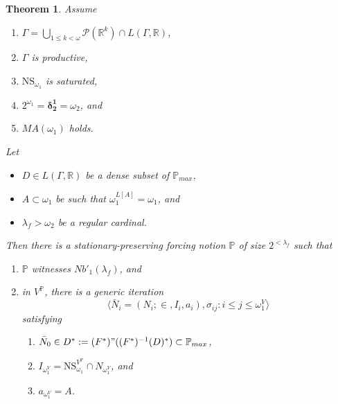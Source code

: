 \documentclass[12pt, twoside]{memoir}
\numberwithin{equation}{section}
\newtheorem{thm}{Theorem}[section]
\theoremstyle{definition}
\theoremstyle{remark}
\theoremstyle{definition}
\theoremstyle{definition}
\theoremstyle{definition}
\theoremstyle{remark}
\begin{document}
\begin{thm}\label{notion2}
Assume
\begin{enumerate}[label=(\roman*), leftmargin=40pt]
    \item\label{h1} $\Gamma  = \bigcup_{1 \leq k < \omega} \mathcal{P}(\mathbb{R}^{k}) \cap L(\Gamma, \mathbb{R})$,
    \item\label{h2} $\Gamma$ is productive,
    \item\label{h3} $\mathrm{NS}_{\omega_1}$ is saturated,
    \item\label{h4} $2^{\omega_1} = \mathbf{\delta^1_2} = \omega_2$, and
    \item\label{h5} $MA(\omega_1)$ holds.
\end{enumerate}
Let 
\begin{itemize}
    \item $D \in L(\Gamma, \mathbb{R})$ be a dense subset of $\mathbb{P}_{max}$,
    \item $A \subset \omega_1$ be such that $\omega_1^{L[A]} = \omega_1$, and
    \item $\lambda_f > \omega_2$ be a regular cardinal.
\end{itemize}
Then there is a stationary-preserving forcing notion $\mathbb{P}$ of size $2^{< \lambda_f}$ such that 
\begin{enumerate}[label=(\alph*)]
    \item $\mathbb{P}$ witnesses $Nb'_1(\lambda_f)$, and
    \item in $V^{\mathbb{P}}$, there is a generic iteration $$\langle \bar{N}_i = (N_i; \in, I_i, a_i), \sigma_{ij} : i \leq j \leq \omega_1^V \rangle$$ satisfying 
    \begin{enumerate}[label=(\arabic*), leftmargin=40pt]
        \item\label{nov1} $\bar{N}_0 \in D^* := (F^*) " ((F^*)^{-1}(D)^*) \subset \mathbb{P}_{max}$,
        \item\label{nov2} $I_{\omega_1^V} = \mathrm{NS}_{\omega_1}^{V^{\mathbb{P}}} \cap N_{\omega_1^V}$, and
        \item\label{nov3} $a_{\omega_1^V} = A$.
    \end{enumerate}
\end{enumerate}
\end{thm}
\end{document}
